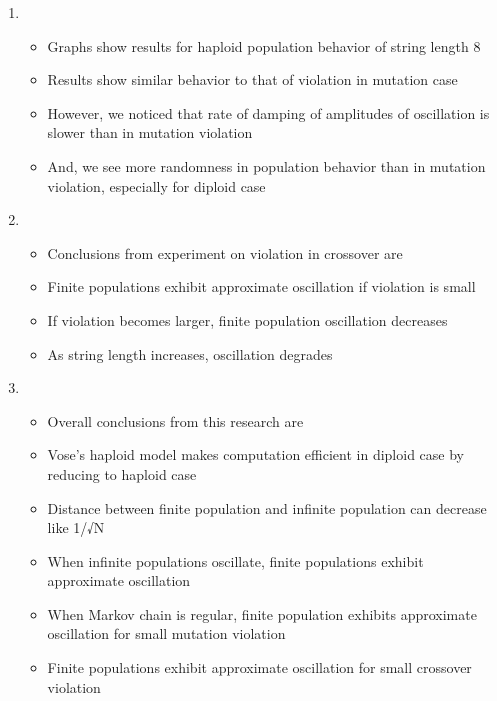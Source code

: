 \documentclass{article}
\begin{document}
\begin{enumerate}
\item
  \begin{itemize}
  \item Graphs show results for haploid population behavior of string length 8
  \item Results show similar behavior to that of violation in mutation case
  \item However, we noticed that rate of damping of amplitudes of oscillation is slower than in mutation violation  
  \item And, we see more randomness in population behavior than in mutation violation, especially for diploid case
  \end{itemize}
  
\item
  \begin{itemize}
  \item Conclusions from experiment on violation in crossover are 
  \item Finite populations exhibit approximate oscillation if violation is small
  \item If violation becomes larger, finite population oscillation decreases
  \item As string length increases, oscillation degrades
  \end{itemize}
  
\item
  \begin{itemize}
  \item Overall conclusions from this research are
  \item Vose's haploid model makes computation efficient in diploid case by reducing to haploid case 
  \item Distance between finite population and infinite population can decrease like 1/√N
  \item When infinite populations oscillate, finite populations exhibit approximate oscillation
  \item When Markov chain is regular, finite population exhibits approximate oscillation for small mutation violation
  \item Finite populations exhibit approximate oscillation for small crossover violation      
  
  \end{itemize}
  

\end{enumerate}
\end{document}
